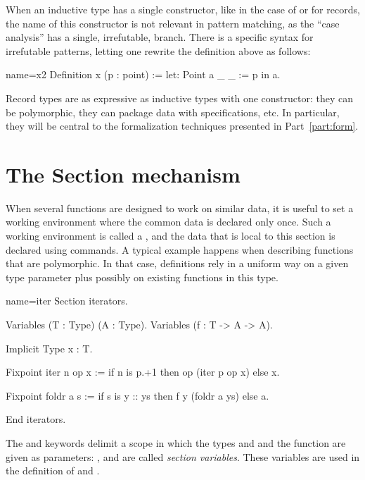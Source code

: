 When an inductive type has a single constructor, like in the case of
 or for records, the name of this constructor is not relevant
in pattern matching, as the ``case analysis'' has a single, irrefutable,
branch. There is a specific syntax for irrefutable patterns, letting
one rewrite the definition above as follows:

\begin{coq}{name=x2}{}
Definition x (p : point) := let: Point a _ _ := p in a.
\end{coq}

Record types are as expressive as inductive types with one
constructor: they can be polymorphic, they can package data with
specifications, etc. In particular, they will be central to the
formalization techniques presented in Part~\ref{part:form}.


\section{The Section mechanism}\label{sec:section}
When several functions are designed to work on similar data, it is
useful to set a working environment where the common data is declared
only once.  Such a working environment is called a , and
the data that is local to this section is declared using 
commands.  A typical example happens when describing functions that
are polymorphic. In that case, definitions rely in a uniform way on a
given type parameter plus possibly on existing functions in this type.


\begin{coq}{name=iter}{}
Section iterators.

Variables (T : Type) (A : Type).
Variables (f : T -> A -> A).

Implicit Type x : T.

Fixpoint iter n op x :=
  if n is p.+1 then op (iter p op x) else x.

Fixpoint foldr a s :=
  if s is y :: ys then f y (foldr a ys) else a.

End iterators.
\end{coq}
The  and  keywords delimit a scope in which
the types  and  and the function  are given as
parameters: ,  and  are called \emph{section
  variables}.  These variables
are used in the definition of  and .


